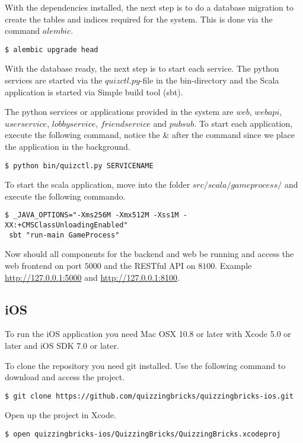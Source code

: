 With the dependencies installed, the next step is to do a database migration to create the tables and indices required for the system. This is done via the command $alembic$.

\begin{verbatim}
$ alembic upgrade head
\end{verbatim}

With the database ready, the next step is to start each service. The python services are started via the $quizctl.py$-file in the bin-directory and the Scala application is started via Simple build tool (sbt).

The python services or applications provided in the system are $web$, $webapi$, $userservice$, $lobbyservice$, $friendservice$ and $pubsub$.
To start each application, execute the following command, notice the $\&$ after the command since we place the application in the background.

\begin{verbatim}
$ python bin/quizctl.py SERVICENAME
\end{verbatim}

To start the scala application, move into the folder $src/scala/gameprocess/$ and execute the following commando.
\begin{verbatim}
$ _JAVA_OPTIONS="-Xms256M -Xmx512M -Xss1M -XX:+CMSClassUnloadingEnabled"
 sbt "run-main GameProcess"
\end{verbatim}

Now should all components for the backend and web be running and access the web frontend on port $5000$ and the RESTful API on $8100$. Example \url{http://127.0.0.1:5000} and \url{http://127.0.0.1:8100}.

\subsection{iOS}
To run the iOS application you need Mac OSX 10.8 or later with Xcode 5.0 or later and iOS SDK 7.0 or later.

To clone the repository you need git installed. Use the following command to download and access the project.

\begin{verbatim}
$ git clone https://github.com/quizzingbricks/quizzingbricks-ios.git

\end{verbatim}

Open up the project in Xcode.

\begin{verbatim}
$ open quizzingbricks-ios/QuizzingBricks/QuizzingBricks.xcodeproj
\end{verbatim}

